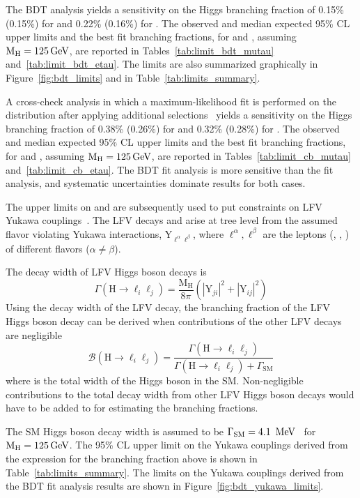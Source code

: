 The BDT analysis yields a sensitivity on the Higgs branching fraction of 0.15\% (0.15\%) for \Hmt and 0.22\% (0.16\%) for \Het. The observed and median expected 95\% CL upper limits and the best fit branching fractions, for \BHmt and \BHet, assuming $\text{M}_{\text{H}} = 125 \,\text{Ge\hspace{-.08em}V}$, are reported in Tables~\ref{tab:limit_bdt_mutau} and~\ref{tab:limit_bdt_etau}. The limits are also summarized graphically in Figure~\ref{fig:bdt_limits} and in Table~\ref{tab:limits_summary}.

A cross-check analysis in which a maximum-likelihood fit is performed on the \mcol distribution after applying additional selections~\cite{Sirunyan:2017xzt} yields a sensitivity on the Higgs branching fraction of 0.38\% (0.26\%) for \Hmt and 0.32\% (0.28\%) for \Het. The observed and median expected 95\% CL upper limits and the best fit branching fractions, for \BHmt and \BHet, assuming $\text{M}_{\text{H}} = 125 \,\text{Ge\hspace{-.08em}V}$, are reported in Tables~\ref{tab:limit_cb_mutau} and~\ref{tab:limit_cb_etau}. The BDT fit analysis is more sensitive than the \mcol fit analysis, and systematic uncertainties dominate results for both cases.

The upper limits on \BHmt and \BHet are subsequently used to put constraints on LFV Yukawa couplings~\cite{Harnik:2012pb}. The LFV decays \Pe{}\Pgt and \Pgm{}\Pgt arise at tree level from the assumed flavor violating Yukawa interactions, $\text{Y}_{\ell^\alpha\ell^{\beta}}$, where $\ell^\alpha, \ell^\beta$ are the leptons (\Pe, \Pgm, \Pgt) of different flavors ($\alpha\ne\beta$).

The decay width of LFV Higgs boson decays is
\begin{equation}
  \Gamma(\text{H} \to \ell_{i} \ell_{j})=\frac{\text{M}_{\text{H}}}{8 \pi}(|\text{Y}_{j i}|^2+|\text{Y}_{i j}|^2)
\end{equation}
Using the decay width of the LFV decay, the branching fraction of the LFV Higgs boson decay can be derived when contributions of the other LFV decays are negligible
\begin{equation}
  \mathcal{B}(\text{H} \to \ell_{i} \ell_{j})=\frac{\Gamma(\text{H} \to \ell_{i} \ell_{j})}{\Gamma(\text{H} \to \ell_{i} \ell_{j})+\Gamma_{\text{SM}}}
\end{equation}
where \gsm is the total width of the Higgs boson in the SM. Non-negligible contributions to the total decay width from other LFV Higgs boson decays would have to be added to \gsm for estimating the branching fractions.

The SM Higgs boson decay width is assumed to be $\Gamma_{\text{SM}} = 4.1~\,\text{Me\hspace{-.08em}V}$~\cite{Denner:2011mq} for $\text{M}_{\text{H}} = 125 \,\text{Ge\hspace{-.08em}V}$. The 95\% CL upper limit on the Yukawa couplings derived from the expression for the branching fraction above is shown in Table~\ref{tab:limits_summary}. The limits on the Yukawa couplings derived from the BDT fit analysis results are shown in Figure~\ref{fig:bdt_yukawa_limits}.

